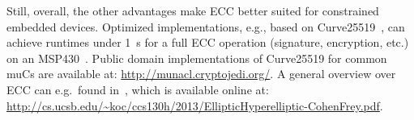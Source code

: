 Still, overall, the other  advantages make \ac{ECC} better suited for constrained embedded devices. Optimized implementations, e.g., based on Curve25519~\cite{bernstein2006curve25519}, can achieve runtimes under 1~s for a full \ac{ECC} operation (signature, encryption, etc.) on an MSP430~\cite{hinterwalder2014full}. 
%
Public domain implementations of Curve25519 for common \acp{muC} are available at: \url{http://munacl.cryptojedi.org/}. 
%
A general overview over \ac{ECC} can e.g.~found in~\cite{Cohen:2012:HEH:2463153}, which is available online at: \url{http://cs.ucsb.edu/~koc/ccs130h/2013/EllipticHyperelliptic-CohenFrey.pdf}.





